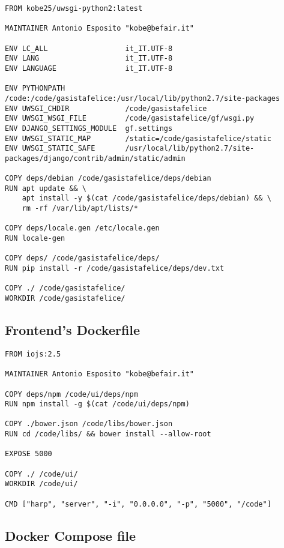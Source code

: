 \begin{verbatim}
FROM kobe25/uwsgi-python2:latest

MAINTAINER Antonio Esposito "kobe@befair.it"

ENV LC_ALL                  it_IT.UTF-8
ENV LANG                    it_IT.UTF-8
ENV LANGUAGE                it_IT.UTF-8

ENV PYTHONPATH              /code:/code/gasistafelice:/usr/local/lib/python2.7/site-packages
ENV UWSGI_CHDIR             /code/gasistafelice
ENV UWSGI_WSGI_FILE         /code/gasistafelice/gf/wsgi.py
ENV DJANGO_SETTINGS_MODULE  gf.settings
ENV UWSGI_STATIC_MAP        /static=/code/gasistafelice/static
ENV UWSGI_STATIC_SAFE       /usr/local/lib/python2.7/site-packages/django/contrib/admin/static/admin

COPY deps/debian /code/gasistafelice/deps/debian
RUN apt update && \
    apt install -y $(cat /code/gasistafelice/deps/debian) && \
    rm -rf /var/lib/apt/lists/*

COPY deps/locale.gen /etc/locale.gen
RUN locale-gen

COPY deps/ /code/gasistafelice/deps/
RUN pip install -r /code/gasistafelice/deps/dev.txt

COPY ./ /code/gasistafelice/
WORKDIR /code/gasistafelice/
\end{verbatim}

\subsection{Frontend's Dockerfile}\label{frontends-dockerfile}

\begin{verbatim}
FROM iojs:2.5

MAINTAINER Antonio Esposito "kobe@befair.it"

COPY deps/npm /code/ui/deps/npm
RUN npm install -g $(cat /code/ui/deps/npm)

COPY ./bower.json /code/libs/bower.json
RUN cd /code/libs/ && bower install --allow-root

EXPOSE 5000

COPY ./ /code/ui/
WORKDIR /code/ui/

CMD ["harp", "server", "-i", "0.0.0.0", "-p", "5000", "/code"]
\end{verbatim}

\subsection{Docker Compose file}\label{docker-compose-file}

